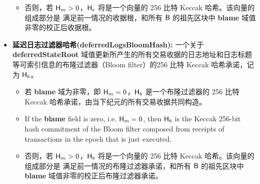 \begin{itemize}[nosep]
\begin{itemize}
		\item 否则，若 $\textsf{H}_m>0$，$\textsf{H}_e$ 将是一个向量的 256 比特 Keccak 哈希。该向量的组成部分是 满足前一情况的收据根，和所有 $\textsf{B}$ 的祖先区块中 {\bf blame} 域值非零的校正后收据根。
	\end{itemize}
	
	
	\item {\bf 延迟日志过滤器哈希(deferredLogsBloomHash):} 一个关于 {\bf deferredStateRoot} 域值更新所产生的所有交易收据的日志地址和日志标题等可索引信息的布隆过滤器（Bloom filter）的256 比特 Keccak 哈希承诺，记为 $\textsf{H}_b$。	
	\begin{itemize}
		\item 若 {\bf blame} 域为非零，即 $\textsf{H}_m=0$，$\textsf{H}_b$ 是一个布隆过滤器的 256 比特 Keccak 哈希承诺，由当下纪元的所有交易收据共同构造。
		\item If the {\bf blame} field is zero, i.e. $\textsf{H}_m=0$, then $\textsf{H}_b$ is the Keccak 256-bit hash commitment of the Bloom filter composed from receipts of transactions in the epoch that is just executed.
	
		\item 否则，若 $\textsf{H}_m>0$，$\textsf{H}_b$ 将是一个向量的 256 比特 Keccak 哈希。该向量的组成部分是 满足前一情况的布隆过滤器承诺，和所有 $\textsf{B}$ 的祖先区块中 {\bf blame} 域值非零的校正后布隆过滤器承诺。
	\end{itemize}


\end{itemize}
